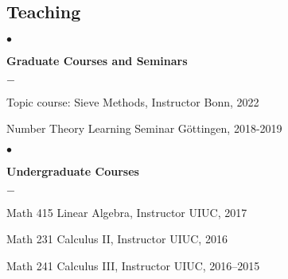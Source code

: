 \documentclass[margin,line,pifont,palatino,courier,10pt]{res}
\newenvironment{list1}{
  \begin{list}{$\bullet$}{%
      \setlength{\itemsep}{0in}
      \setlength{\parsep}{0in} \setlength{\parskip}{0in}
      \setlength{\topsep}{0in} \setlength{\partopsep}{0in}
      \setlength{\leftmargin}{0.17in}}}{\end{list}}
\newenvironment{list2}{
  \begin{list}{$-$}{%
      \setlength{\itemsep}{0in}
      \setlength{\parsep}{0in} \setlength{\parskip}{0in}
      \setlength{\topsep}{0in} \setlength{\partopsep}{0in}
      \setlength{\leftmargin}{0.2in}}}{\end{list}}
\begin{document}
\begin{resume}
%	


\section{\sc Teaching}
\begin{list1}
	\item \textbf{Graduate Courses and Seminars}
	\begin{list2}
		\item Topic course: Sieve Methods, Instructor {\hfill  Bonn,  2022}
		\item Number Theory Learning Seminar {\hfill  G\"ottingen,  2018-2019}
	\end{list2}
\end{list1}
\begin{list1}
	\item \textbf{Undergraduate Courses}
	\begin{list2}
\item Math 415 Linear Algebra, Instructor {\hfill  UIUC, 2017}
\item Math 231 Calculus II, Instructor {\hfill  UIUC,  2016}
\item Math 241 Calculus III, Instructor {\hfill  UIUC, 2016--2015} 
	\end{list2}
\end{list1}




\end{resume}
\end{document}
